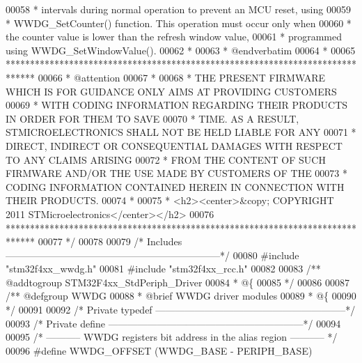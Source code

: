 \begin{DoxyCode}
00058 \textcolor{comment}{  *             intervals during normal operation to prevent an MCU reset, using}
00059 \textcolor{comment}{  *             WWDG\_SetCounter() function. This operation must occur only when}
00060 \textcolor{comment}{  *             the counter value is lower than the refresh window value, }
00061 \textcolor{comment}{  *             programmed using WWDG\_SetWindowValue().         }
00062 \textcolor{comment}{  *}
00063 \textcolor{comment}{  *  @endverbatim  }
00064 \textcolor{comment}{  *                             }
00065 \textcolor{comment}{  ******************************************************************************}
00066 \textcolor{comment}{  * @attention}
00067 \textcolor{comment}{  *}
00068 \textcolor{comment}{  * THE PRESENT FIRMWARE WHICH IS FOR GUIDANCE ONLY AIMS AT PROVIDING CUSTOMERS}
00069 \textcolor{comment}{  * WITH CODING INFORMATION REGARDING THEIR PRODUCTS IN ORDER FOR THEM TO SAVE}
00070 \textcolor{comment}{  * TIME. AS A RESULT, STMICROELECTRONICS SHALL NOT BE HELD LIABLE FOR ANY}
00071 \textcolor{comment}{  * DIRECT, INDIRECT OR CONSEQUENTIAL DAMAGES WITH RESPECT TO ANY CLAIMS ARISING}
00072 \textcolor{comment}{  * FROM THE CONTENT OF SUCH FIRMWARE AND/OR THE USE MADE BY CUSTOMERS OF THE}
00073 \textcolor{comment}{  * CODING INFORMATION CONTAINED HEREIN IN CONNECTION WITH THEIR PRODUCTS.}
00074 \textcolor{comment}{  *}
00075 \textcolor{comment}{  * <h2><center>&copy; COPYRIGHT 2011 STMicroelectronics</center></h2>}
00076 \textcolor{comment}{  ******************************************************************************}
00077 \textcolor{comment}{  */}
00078 
00079 \textcolor{comment}{/* Includes ------------------------------------------------------------------*/}
00080 \textcolor{preprocessor}{#}\textcolor{preprocessor}{include} "stm32f4xx_wwdg.h"
00081 \textcolor{preprocessor}{#}\textcolor{preprocessor}{include} "stm32f4xx_rcc.h"
00082 
00083 \textcolor{comment}{/** @addtogroup STM32F4xx\_StdPeriph\_Driver}
00084 \textcolor{comment}{  * @\{}
00085 \textcolor{comment}{  */}
00086 
00087 \textcolor{comment}{/** @defgroup WWDG }
00088 \textcolor{comment}{  * @brief WWDG driver modules}
00089 \textcolor{comment}{  * @\{}
00090 \textcolor{comment}{  */}
00091 
00092 \textcolor{comment}{/* Private typedef -----------------------------------------------------------*/}
00093 \textcolor{comment}{/* Private define ------------------------------------------------------------*/}
00094 
00095 \textcolor{comment}{/* ----------- WWDG registers bit address in the alias region ----------- */}
00096 \textcolor{preprocessor}{#}\textcolor{preprocessor}{define} \textcolor{preprocessor}{WWDG\_OFFSET}       \textcolor{preprocessor}{(}WWDG_BASE \textcolor{preprocessor}{-} PERIPH_BASE\textcolor{preprocessor}{)}

\end{DoxyCode}
